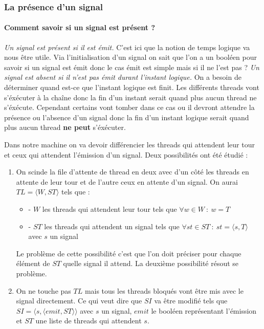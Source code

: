 \documentclass[10pt,a4paper]{article}
\begin{document}
				
			\subsubsection{La présence d'un signal}
				
				\paragraph{Comment savoir si un signal est présent ?}
				\textit{Un signal est présent si il est émit.}
				\smallbreak
				C'est ici que la notion de temps logique va nous être utile. Via l'initialisation d'un signal on sait que l'on a un booléen pour savoir si un signal est émit donc le cas émit est simple mais si il ne l'est pas ? 
				\smallbreak
				\textit{Un signal est absent si il n'est pas émit durant l'instant logique.}
				\smallbreak
				On a besoin de déterminer quand est-ce que l'instant logique est finit. Les différents threads vont s'éxécuter à la chaîne donc la fin d'un instant serait quand plus aucun thread ne s'éxécute. Cependant certains vont tomber dans ce cas ou il devront attendre la présence ou l'absence d'un signal donc la fin d'un instant logique serait quand plus aucun thread \textbf{ne peut} s'éxécuter. 
				\medbreak
					
				Dans notre machine on va devoir différencier les threads qui attendent leur tour et ceux qui attendent l'émission d'un signal. Deux possibilités ont été étudié :
				\begin{enumerate}
					\item On scinde la file d'attente de thread en deux avec d'un côté les threads en attente de leur tour et 
					de l'autre ceux en attente d'un signal. On aurai $TL =\langle W,ST\rangle$ tels que :
					\begin{itemize}
						\item[] - $W$ les threads qui attendent leur tour tels que $\forall w \in W~:~w = T$ 
						\item[] - $ST$ les threads qui attendent un signal tels que $\forall st \in ST~:~st = \langle s,T\rangle$ avec $s$ un signal
					\end{itemize}
					\medbreak
						
					Le problème de cette possibilité c'est que l'on doit préciser pour chaque élément de $ST$ quelle signal il attend. La deuxième possibilité résout se problème.
					\item On ne touche pas $TL$ mais tous les threads bloqués vont être mis avec le signal directement. Ce qui veut dire que $SI$ va être modifié tels que $SI = \langle s , \langle emit , ST \rangle\rangle$ avec $s$ un signal, $emit$ le booléen représentant l'émission et $ST$ une liste de threads qui attendent $s$.
				\end{enumerate}
				\medbreak
					
\end{document}
